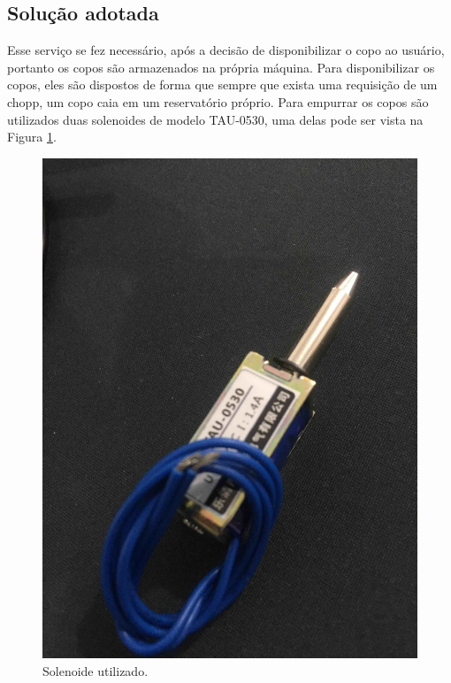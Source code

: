 \subsection{Solução adotada}

 Esse serviço se fez necessário, após a decisão de disponibilizar o copo ao usuário, 
 portanto os copos são  armazenados na própria máquina. Para disponibilizar os copos, 
 eles são dispostos de forma que sempre que exista uma requisição de um chopp, 
 um copo caia em um reservatório próprio. Para empurrar os copos são utilizados duas 
 solenoides de modelo TAU-0530, uma delas pode ser vista na Figura \ref{solenoide}. 

\begin{figure}[!h]
            \centering
         	\includegraphics[scale= 0.06]{figuras/solenoide.jpg}
            \caption{Solenoide utilizado.}
            \label{solenoide}
\end{figure}

